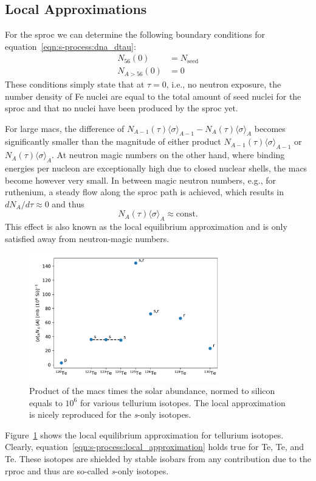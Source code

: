 \subsection{Local Approximations}\label{sec:s-process:local_approximation}

For the \ac{sproc} we can determine the following boundary conditions for equation~\eqref{eqn:s-process:dna_dtau}:
\begin{align}
    N_{56}(0) &= N_\mathrm{seed}\\
    N_{A>56}(0) &= 0
\end{align}
These conditions simply state that at $\tau=0$, i.e., no neutron exposure, the number density of Fe nuclei are equal to the total amount of seed nuclei for the \ac{sproc} and that no nuclei have been produced by the \ac{sproc} yet. 

For large \ac{macs}, the difference of $N_{A-1}(\tau) \langle\sigma\rangle_{A-1} - N_A(\tau)\langle\sigma\rangle_{A}$ becomes significantly smaller than the magnitude of either product $N_{A-1}(\tau)\langle\sigma\rangle_{A-1}$ or $N_A(\tau)\langle\sigma\rangle_{A}$. At neutron magic numbers on the other hand, where binding energies per nucleon are exceptionally high due to closed nuclear shells, the \ac{macs} become however very small. In between magic neutron numbers, e.g., for ruthenium, a steady flow along the \ac{sproc} path is achieved, which results in $dN_A/d\tau \approx 0$ and thus
\begin{equation}
    N_A(\tau)\langle\sigma\rangle_A \approx \mathrm{const.} \label{eqn:s-process:local_approximation}
\end{equation}
This effect is also known as the local equilibrium approximation and is only satisfied away from neutron-magic numbers.
\begin{figure}[tb]
    \centering
    \includegraphics[width=0.75\textwidth]{graphics/s-process/local_approx}
    \caption{Product of the \ac{macs} times the solar abundance, normed to silicon equals to $10^{6}$ for various tellurium isotopes. The local approximation is nicely reproduced for the \textit{s}-only isotopes.}
    \label{fig:s-process:local_approximation_te}
\end{figure}
Figure~\ref{fig:s-process:local_approximation_te} shows the local equilibrium approximation for tellurium isotopes. Clearly, equation~\eqref{eqn:s-process:local_approximation} holds true for Te, Te, and Te. These isotopes are shielded by stable isobars from any contribution due to the \ac{rproc} and thus are so-called \textit{s}-only isotopes.


